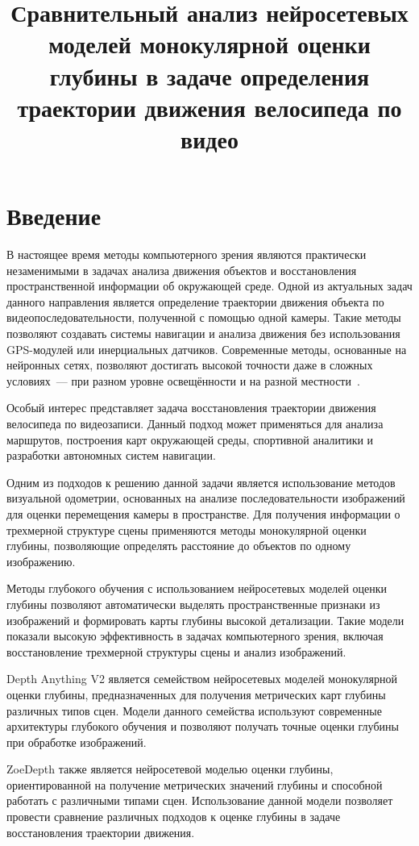 \documentclass{misisarticle}
\title{Сравнительный анализ нейросетевых моделей монокулярной оценки глубины в задаче определения траектории движения велосипеда по видео}
\begin{document}
\maketitle

\section{Введение}

В настоящее время методы компьютерного зрения являются практически незаменимыми в задачах анализа движения объектов и восстановления пространственной информации об окружающей среде. Одной из актуальных задач данного направления является определение траектории движения объекта по видеопоследовательности, полученной с помощью одной камеры. Такие методы позволяют создавать системы навигации и анализа движения без использования GPS-модулей или инерциальных датчиков. Современные методы, основанные на нейронных сетях, позволяют достигать высокой точности даже в сложных условиях~--- при разном уровне освещённости и на разной местности~\cite{ref1}.

Особый интерес представляет задача восстановления траектории движения велосипеда по видеозаписи. Данный подход может применяться для анализа маршрутов, построения карт окружающей среды, спортивной аналитики и разработки автономных систем навигации.

Одним из подходов к решению данной задачи является использование методов визуальной одометрии, основанных на анализе последовательности изображений для оценки перемещения камеры в пространстве. Для получения информации о трехмерной структуре сцены применяются методы монокулярной оценки глубины, позволяющие определять расстояние до объектов по одному изображению.

Методы глубокого обучения с использованием нейросетевых моделей оценки глубины позволяют автоматически выделять пространственные признаки из изображений и формировать карты глубины высокой детализации. Такие модели показали высокую эффективность в задачах компьютерного зрения, включая восстановление трехмерной структуры сцены и анализ изображений.

Depth Anything V2 является семейством нейросетевых моделей монокулярной оценки глубины, предназначенных для получения метрических карт глубины различных типов сцен. Модели данного семейства используют современные архитектуры глубокого обучения и позволяют получать точные оценки глубины при обработке изображений.

ZoeDepth также является нейросетевой моделью оценки глубины, ориентированной на получение метрических значений глубины и способной работать с различными типами сцен. Использование данной модели позволяет провести сравнение различных подходов к оценке глубины в задаче восстановления траектории движения.
\end{document}
